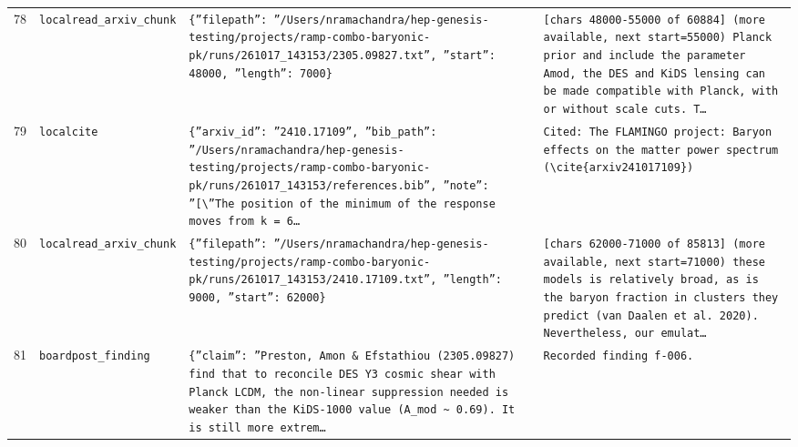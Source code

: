 \documentclass[11pt,a4paper]{article}
\begin{document}
\begin{longtable}{@{}p{}p{}p{}p{}@{}}
78 & \texttt{local}\newline\texttt{read\_\allowbreak{}arxiv\_\allowbreak{}chunk} & \texttt{\{''filepath'':\allowbreak{} ''/\allowbreak{}Users/\allowbreak{}nramachandra/\allowbreak{}hep-genesis-testing/\allowbreak{}projects/\allowbreak{}ramp-combo-baryonic-pk/\allowbreak{}runs/\allowbreak{}261017\_\allowbreak{}143153/\allowbreak{}2305.09827.txt'',\allowbreak{} ''start'':\allowbreak{} 48000,\allowbreak{} ''length'':\allowbreak{} 7000\}\allowbreak{}} & \texttt{[chars 48000-55000 of 60884]\allowbreak{} (more available,\allowbreak{} next start=\allowbreak{}55000)\allowbreak{}  Planck prior and include the parameter Amod,\allowbreak{} the DES and KiDS lensing can be made compatible with Planck,\allowbreak{} with or without scale cuts. T\ldots{}\allowbreak{}} \\
79 & \texttt{local}\newline\texttt{cite} & \texttt{\{''arxiv\_\allowbreak{}id'':\allowbreak{} ''2410.17109'',\allowbreak{} ''bib\_\allowbreak{}path'':\allowbreak{} ''/\allowbreak{}Users/\allowbreak{}nramachandra/\allowbreak{}hep-genesis-testing/\allowbreak{}projects/\allowbreak{}ramp-combo-baryonic-pk/\allowbreak{}runs/\allowbreak{}261017\_\allowbreak{}143153/\allowbreak{}references.bib'',\allowbreak{} ''note'':\allowbreak{} ''[\textbackslash{}\allowbreak{}''The position of the minimum of the response moves from k =\allowbreak{} 6\ldots{}\allowbreak{}} & \texttt{Cited:\allowbreak{} The FLAMINGO project:\allowbreak{} Baryon effects on the matter power spectrum (\textbackslash{}\allowbreak{}cite\{arxiv241017109\}\allowbreak{})\allowbreak{}} \\
80 & \texttt{local}\newline\texttt{read\_\allowbreak{}arxiv\_\allowbreak{}chunk} & \texttt{\{''filepath'':\allowbreak{} ''/\allowbreak{}Users/\allowbreak{}nramachandra/\allowbreak{}hep-genesis-testing/\allowbreak{}projects/\allowbreak{}ramp-combo-baryonic-pk/\allowbreak{}runs/\allowbreak{}261017\_\allowbreak{}143153/\allowbreak{}2410.17109.txt'',\allowbreak{} ''length'':\allowbreak{} 9000,\allowbreak{} ''start'':\allowbreak{} 62000\}\allowbreak{}} & \texttt{[chars 62000-71000 of 85813]\allowbreak{} (more available,\allowbreak{} next start=\allowbreak{}71000)\allowbreak{}  these models is relatively broad,\allowbreak{} as is the baryon fraction in clusters they predict (van Daalen et al. 2020)\allowbreak{}. Nevertheless,\allowbreak{} our emulat\ldots{}\allowbreak{}} \\
81 & \texttt{board}\newline\texttt{post\_\allowbreak{}finding} & \texttt{\{''claim'':\allowbreak{} ''Preston,\allowbreak{} Amon \& Efstathiou (2305.09827)\allowbreak{} find that to reconcile DES Y3 cosmic shear with Planck LCDM,\allowbreak{} the non-linear suppression needed is weaker than the KiDS-1000 value (A\_\allowbreak{}mod \textasciitilde{}\allowbreak{} 0.69)\allowbreak{}. It is still more extrem\ldots{}\allowbreak{}} & \texttt{Recorded finding f-006.} \\

\end{longtable}
\end{document}
